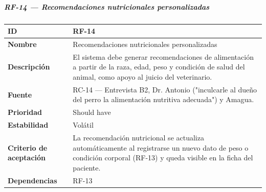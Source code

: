 \documentclass[
]{article}
\newcounter{none} %
\begin{document}
\subparagraph{RF-14 --- Recomendaciones nutricionales
personalizadas}\label{rf-14-recomendaciones-nutricionales-personalizadas}

{\def\LTcaptype{none} %
\begin{longtable}[]{@{}
  >{\raggedright\arraybackslash}p{}
  >{\raggedright\arraybackslash}p{}@{}}
\toprule\noalign{}
\begin{minipage}[b]{\linewidth}\raggedright
\textbf{ID}
\end{minipage} & \begin{minipage}[b]{\linewidth}\raggedright
RF-14
\end{minipage} \\
\midrule\noalign{}
\endhead
\bottomrule\noalign{}
\endlastfoot
\textbf{Nombre} & \begin{minipage}[t]{\linewidth}\raggedright
Recomendaciones nutricionales personalizadas
\end{minipage} \\
\textbf{Descripción} & \begin{minipage}[t]{\linewidth}\raggedright
El sistema debe generar recomendaciones de alimentación a partir de la
raza, edad, peso y condición de salud del animal, como apoyo al juicio
del veterinario.
\end{minipage} \\
\textbf{Fuente} & \begin{minipage}[t]{\linewidth}\raggedright
RC-14 --- Entrevista B2, Dr. Antonio ("inculcarle al dueño del perro la
alimentación nutritiva adecuada") y Amagua.
\end{minipage} \\
\textbf{Prioridad} & \begin{minipage}[t]{\linewidth}\raggedright
Should have
\end{minipage} \\
\textbf{Estabilidad} & \begin{minipage}[t]{\linewidth}\raggedright
Volátil
\end{minipage} \\
\textbf{Criterio de aceptación} &
\begin{minipage}[t]{\linewidth}\raggedright
La recomendación nutricional se actualiza automáticamente al registrarse
un nuevo dato de peso o condición corporal (RF-13) y queda visible en la
ficha del paciente.
\end{minipage} \\
\textbf{Dependencias} & \begin{minipage}[t]{\linewidth}\raggedright
RF-13
\end{minipage} \\
\end{longtable}
}
\end{document}
